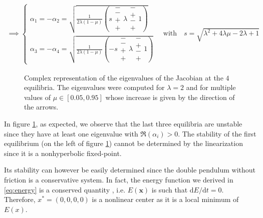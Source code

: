 \documentclass[11 pt]{article}
\begin{document}
\begin{align}
    \implies 
    \begin{cases}
        \alpha_1 = -\alpha_2 = \sqrt{\frac{1}{2\lambda \left(1 - \mu\right)} \left(s \mathrel{\substack{-\\-\\+\\+}} \lambda \mathrel{\substack{-\\+\\-\\+}} 1\right)}\\
        \alpha_3 = -\alpha_4 = \sqrt{\frac{1}{2\lambda \left(1 - \mu\right)} \left(-s \mathrel{\substack{-\\-\\+\\+}} \lambda \mathrel{\substack{-\\+\\-\\+}} 1\right)}
    \end{cases} \quad
    \text{with} \quad s = \sqrt{\lambda^2 + 4\lambda \mu - 2 \lambda + 1} \label{eq:eigenvalues}
\end{align}

\begin{figure}[htp]
    \centering
    
    \caption{Complex representation of the eigenvalues of the Jacobian at the $4$ equilibria. The eigenvalues were computed for $\lambda=2$ and for multiple values of $\mu\in [0.05, 0.95]$ whose increase is given by the direction of the arrows.}
    \label{fig:equilibria}
\end{figure}

In figure \ref{fig:equilibria}, as expected, we observe that the last three equilibria are unstable since they have at least one eigenvalue with $\Re(\alpha_i)>0$. The stability of the first equilibrium (on the left of figure \ref{fig:equilibria}) cannot be determined by the linearization since it is a nonhyperbolic fixed-point.

Its stability can however be easily determined since the double pendulum without friction is a conservative system. In fact, the energy function we derived in \eqref{eq:energy} is a conserved quantity \cite[p.160]{strogatz2018nonlinear}, i.e. $E(\mathbf{x})$ is such that $\mathrm{d}E/\mathrm{d}t=0$. Therefore, $x^{*}=(0, 0, 0, 0)$ is a nonlinear center as it is a local minimum of $E(x)$.
\end{document}
